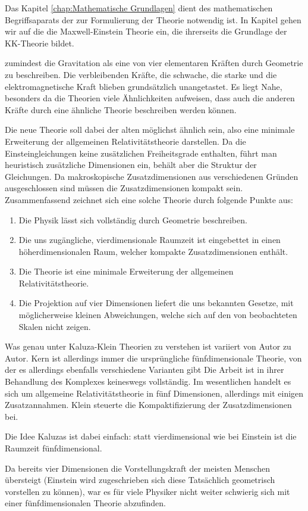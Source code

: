 Das Kapitel \autoref{chap:Mathematische Grundlagen} dient des
mathematischen Begriffsaparats der zur Formulierung der Theorie notwendig ist. In Kapitel gehen wir auf die die
Maxwell-Einstein Theorie ein, die ihrerseits die Grundlage der KK-Theorie
bildet.

zumindest die Gravitation als eine von vier elementaren Kräften durch Geometrie
zu beschreiben. Die verbleibenden Kräfte, die schwache, die starke und die elektromagnetische Kraft
blieben grundsätzlich unangetastet. Es liegt Nahe, besonders da die Theorien
viele Ähnlichkeiten aufweisen, dass auch die anderen Kräfte durch eine ähnliche
Theorie beschreiben werden können.

Die neue Theorie soll dabei der alten 
möglichst ähnlich sein, also eine minimale Erweiterung der allgemeinen
Relativitätstheorie darstellen.
Da die Einsteingleichungen keine
zusätzlichen Freiheitsgrade enthalten, führt man heuristisch zusätzliche
Dimensionen ein, behält aber die Struktur der Gleichungen.
Da makroskopische Zusatzdimensionen aus verschiedenen Gründen ausgeschlossen
sind müssen die Zusatzdimensionen kompakt sein.
Zusammenfassend zeichnet sich eine solche Theorie durch folgende Punkte aus:
\begin{enumerate} 
\item Die Physik lässt sich vollständig durch Geometrie beschreiben.
\item Die uns zugängliche, vierdimensionale Raumzeit ist eingebettet in einen
höherdimensionalen Raum, welcher kompakte Zusatzdimensionen enthält.
\item Die Theorie ist eine minimale Erweiterung der allgemeinen
Relativitätstheorie.
\item Die Projektion auf vier Dimensionen liefert die uns bekannten Gesetze, mit
möglicherweise kleinen Abweichungen, welche sich auf den von beobachteten Skalen
nicht zeigen.
\end{enumerate}
Was genau unter Kaluza-Klein Theorien zu verstehen ist variiert von Autor zu
Autor. Kern ist allerdings immer die ursprüngliche fünfdimensionale Theorie,
von der es allerdings ebenfalls verschiedene Varianten gibt
Die Arbeit ist in ihrer Behandlung des Komplexes keineswegs vollständig. Im
wesentlichen handelt es sich um allgemeine Relativitätstheorie in fünf
Dimensionen, allerdings mit einigen Zusatzannahmen.
Klein steuerte die Kompaktifizierung der Zusatzdimensionen bei.

Die Idee Kaluzas ist dabei einfach: statt vierdimensional wie bei Einstein ist
die Raumzeit fünfdimensional. 

Da bereits vier Dimensionen die Vorstellungskraft der meisten Menschen
übersteigt (Einstein wird zugeschrieben sich diese Tatsächlich geometrisch
vorstellen zu können), war es für viele Physiker nicht weiter schwierig sich mit 
einer fünfdimensionalen Theorie abzufinden. 

